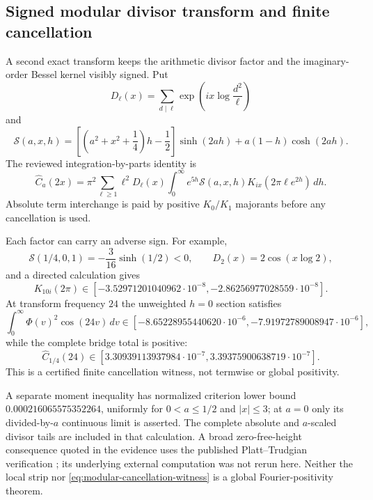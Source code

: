 \documentclass[11pt]{article}
\theoremstyle{definition}
\theoremstyle{remark}
\begin{document}
\subsection{Signed modular divisor transform and finite cancellation}

A second exact transform keeps the arithmetic divisor factor and the
imaginary-order Bessel kernel visibly signed. Put
\begin{equation}
 D_\ell(x)=\sum_{d\mid\ell}
  \exp\!\left(ix\log\frac{d^2}{\ell}\right)
\end{equation}
and
\begin{equation}
 \mathcal S(a,x,h)=
 \left[\left(a^2+x^2+\frac14\right)h-\frac12\right]\sinh(2ah)
 +a(1-h)\cosh(2ah).
\end{equation}
The reviewed integration-by-parts identity is
\begin{equation}
 \widehat C_a(2x)=\pi^2\sum_{\ell\ge1}\ell^2D_\ell(x)
 \int_0^\infty e^{5h}\mathcal S(a,x,h)
 K_{ix}(2\pi\ell e^{2h})\,dh.
 \label{eq:modular-bessel-transform}
\end{equation}
Absolute term interchange is paid by positive $K_0/K_1$ majorants before any
cancellation is used.

Each factor can carry an adverse sign. For example,
\begin{equation}
 \mathcal S(1/4,0,1)=-\frac3{16}\sinh(1/2)<0,
 \qquad D_2(x)=2\cos(x\log2),
\end{equation}
and a directed calculation gives
\begin{equation}
 K_{10i}(2\pi)\in
 [-3.52971201040962\cdot10^{-8},-2.86256977028559\cdot10^{-8}].
\end{equation}
At transform frequency $24$ the unweighted $h=0$ section satisfies
\begin{equation}
 \int_0^\infty\Phi(v)^2\cos(24v)\,dv
 \in[-8.65228955440620\cdot10^{-6},
      -7.91972789008947\cdot10^{-6}],
\end{equation}
while the complete bridge total is positive:
\begin{equation}
 \widehat C_{1/4}(24)
 \in[3.30939113937984\cdot10^{-7},
      3.39375900638719\cdot10^{-7}].
 \label{eq:modular-cancellation-witness}
\end{equation}
This is a certified finite cancellation witness, not termwise or global
positivity.

A separate moment inequality has normalized criterion lower bound
$0.000216065575352264$, uniformly for $0<a\le1/2$ and $|x|\le3$; at $a=0$
only its divided-by-$a$ continuous limit is asserted. The complete absolute and
$a$-scaled divisor tails are included in that calculation. A broad
zero-free-height consequence quoted in the evidence uses the published
Platt--Trudgian verification \cite{PlattTrudgian2021}; its underlying external computation was not
rerun here. Neither the local strip nor
\eqref{eq:modular-cancellation-witness} is a global Fourier-positivity theorem.
\end{document}
